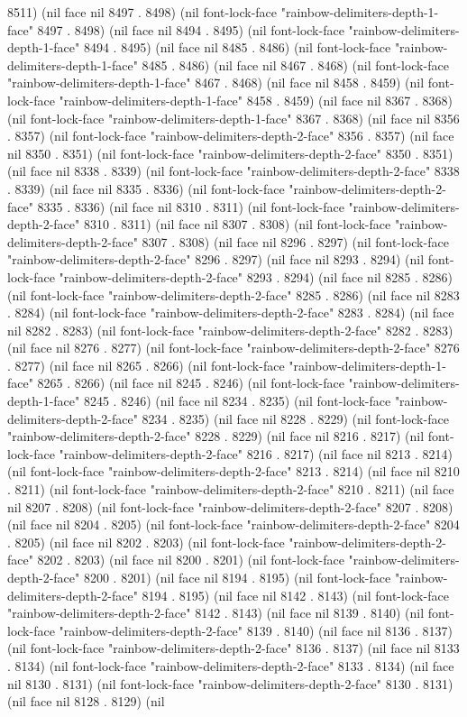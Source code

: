 8511) (nil face nil 8497 . 8498) (nil font-lock-face "rainbow-delimiters-depth-1-face" 8497 . 8498) (nil face nil 8494 . 8495) (nil font-lock-face "rainbow-delimiters-depth-1-face" 8494 . 8495) (nil face nil 8485 . 8486) (nil font-lock-face "rainbow-delimiters-depth-1-face" 8485 . 8486) (nil face nil 8467 . 8468) (nil font-lock-face "rainbow-delimiters-depth-1-face" 8467 . 8468) (nil face nil 8458 . 8459) (nil font-lock-face "rainbow-delimiters-depth-1-face" 8458 . 8459) (nil face nil 8367 . 8368) (nil font-lock-face "rainbow-delimiters-depth-1-face" 8367 . 8368) (nil face nil 8356 . 8357) (nil font-lock-face "rainbow-delimiters-depth-2-face" 8356 . 8357) (nil face nil 8350 . 8351) (nil font-lock-face "rainbow-delimiters-depth-2-face" 8350 . 8351) (nil face nil 8338 . 8339) (nil font-lock-face "rainbow-delimiters-depth-2-face" 8338 . 8339) (nil face nil 8335 . 8336) (nil font-lock-face "rainbow-delimiters-depth-2-face" 8335 . 8336) (nil face nil 8310 . 8311) (nil font-lock-face "rainbow-delimiters-depth-2-face" 8310 . 8311) (nil face nil 8307 . 8308) (nil font-lock-face "rainbow-delimiters-depth-2-face" 8307 . 8308) (nil face nil 8296 . 8297) (nil font-lock-face "rainbow-delimiters-depth-2-face" 8296 . 8297) (nil face nil 8293 . 8294) (nil font-lock-face "rainbow-delimiters-depth-2-face" 8293 . 8294) (nil face nil 8285 . 8286) (nil font-lock-face "rainbow-delimiters-depth-2-face" 8285 . 8286) (nil face nil 8283 . 8284) (nil font-lock-face "rainbow-delimiters-depth-2-face" 8283 . 8284) (nil face nil 8282 . 8283) (nil font-lock-face "rainbow-delimiters-depth-2-face" 8282 . 8283) (nil face nil 8276 . 8277) (nil font-lock-face "rainbow-delimiters-depth-2-face" 8276 . 8277) (nil face nil 8265 . 8266) (nil font-lock-face "rainbow-delimiters-depth-1-face" 8265 . 8266) (nil face nil 8245 . 8246) (nil font-lock-face "rainbow-delimiters-depth-1-face" 8245 . 8246) (nil face nil 8234 . 8235) (nil font-lock-face "rainbow-delimiters-depth-2-face" 8234 . 8235) (nil face nil 8228 . 8229) (nil font-lock-face "rainbow-delimiters-depth-2-face" 8228 . 8229) (nil face nil 8216 . 8217) (nil font-lock-face "rainbow-delimiters-depth-2-face" 8216 . 8217) (nil face nil 8213 . 8214) (nil font-lock-face "rainbow-delimiters-depth-2-face" 8213 . 8214) (nil face nil 8210 . 8211) (nil font-lock-face "rainbow-delimiters-depth-2-face" 8210 . 8211) (nil face nil 8207 . 8208) (nil font-lock-face "rainbow-delimiters-depth-2-face" 8207 . 8208) (nil face nil 8204 . 8205) (nil font-lock-face "rainbow-delimiters-depth-2-face" 8204 . 8205) (nil face nil 8202 . 8203) (nil font-lock-face "rainbow-delimiters-depth-2-face" 8202 . 8203) (nil face nil 8200 . 8201) (nil font-lock-face "rainbow-delimiters-depth-2-face" 8200 . 8201) (nil face nil 8194 . 8195) (nil font-lock-face "rainbow-delimiters-depth-2-face" 8194 . 8195) (nil face nil 8142 . 8143) (nil font-lock-face "rainbow-delimiters-depth-2-face" 8142 . 8143) (nil face nil 8139 . 8140) (nil font-lock-face "rainbow-delimiters-depth-2-face" 8139 . 8140) (nil face nil 8136 . 8137) (nil font-lock-face "rainbow-delimiters-depth-2-face" 8136 . 8137) (nil face nil 8133 . 8134) (nil font-lock-face "rainbow-delimiters-depth-2-face" 8133 . 8134) (nil face nil 8130 . 8131) (nil font-lock-face "rainbow-delimiters-depth-2-face" 8130 . 8131) (nil face nil 8128 . 8129) (nil 
